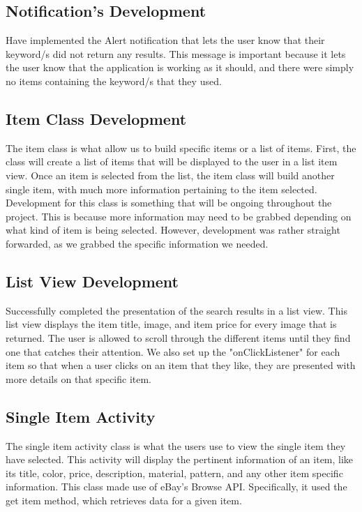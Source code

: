 \documentclass[journal,compsoc, 10pt, draftclsnofoot, onecolumn]{IEEEtran}
\begin{document}
\subsection{Notification's Development}
Have implemented the Alert notification that lets the user know that their 
keyword/s did not return any results. This message is important because it 
lets the user know that the application is working as it should, and there 
were simply no items containing the keyword/s that they used.

\subsection{Item Class Development}
The item class is what allow us to build specific items or a list of items. 
First, the class will create a list of items that will be displayed to the 
user in a list item view. Once an item is selected from the list, the item 
class will build another single item, with much more information pertaining to 
the item selected. Development for this class is something that will be ongoing 
throughout the project. This is because more information may need to be grabbed 
depending on what kind of item is being selected. However, development was rather 
straight forwarded, as we grabbed the specific information we needed. 

\subsection{List View Development}
Successfully completed the presentation of the search results in a list view. 
This list view displays the item title, image, and item price for every image 
that is returned. The user is allowed to scroll through the different items 
until they find one that catches their attention. We also set up the 
"onClickListener" for each item so that when a user clicks on an item that they 
like, they are presented with more details on that specific item.


\subsection{Single Item Activity}
The single item activity class is what the users use to view the single item they 
have selected. This activity will display the pertinent information of an item, 
like its title, color, price, description, material, pattern, and any other item 
specific information. This class made use of eBay's Browse API. Specifically, it 
used the get item method, which retrieves data for a given item. 
\end{document}
